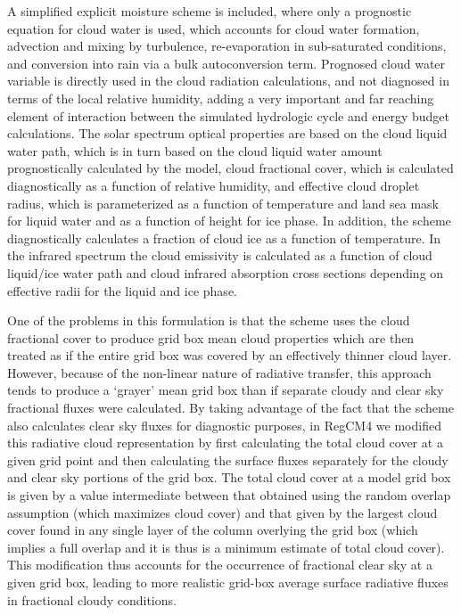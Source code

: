 A simplified explicit moisture scheme \citet{Hsie_84} is included, where only a
prognostic equation for cloud water is used, which accounts for cloud water
formation, advection and mixing by turbulence, re-evaporation in sub-saturated
conditions, and conversion into rain via a bulk autoconversion term.
Prognosed cloud water variable is directly used in the cloud
radiation calculations, and not diagnosed in terms of the local
relative humidity, adding a very important and far reaching element of
interaction between the simulated hydrologic cycle and energy budget
calculations. 
The solar spectrum optical properties are based on the cloud liquid water path,
which is in turn based on the cloud liquid water amount prognostically
calculated by the model, cloud fractional cover, which is calculated
diagnostically as a function of relative humidity, and effective cloud droplet
radius, which is parameterized as a function of temperature and land sea mask
for liquid water and as a function of height for ice phase.
In addition, the scheme diagnostically calculates a fraction of cloud ice as a
function of temperature. In the infrared spectrum the cloud emissivity is
calculated as a function of cloud liquid/ice water path and cloud infrared
absorption cross sections depending on effective radii for the liquid and ice
phase.

One of the problems in this formulation is that the scheme uses the cloud
fractional cover to produce grid box mean cloud properties which are then
treated as if the entire grid box was covered by an effectively thinner
cloud layer. However, because of the non-linear nature of radiative transfer,
this approach tends to produce a ‘grayer’ mean grid box than if separate
cloudy and clear sky fractional fluxes were calculated. By taking advantage
of the fact that the scheme also calculates clear sky fluxes for diagnostic
purposes, in RegCM4 we modified this radiative cloud representation by first
calculating the total cloud cover at a given grid point and then calculating
the surface fluxes separately for the cloudy and clear sky portions of the
grid box. The total cloud cover at a model grid box is given by a value
intermediate between that obtained using the random overlap assumption
(which maximizes cloud cover) and that given by the largest cloud cover
found in any single layer of the column overlying the grid box (which implies
a full overlap and it is thus is a minimum estimate of total cloud cover).
This modification thus accounts for the occurrence of fractional clear sky at
a given grid box, leading to more realistic grid-box average surface radiative
fluxes in fractional cloudy conditions.

